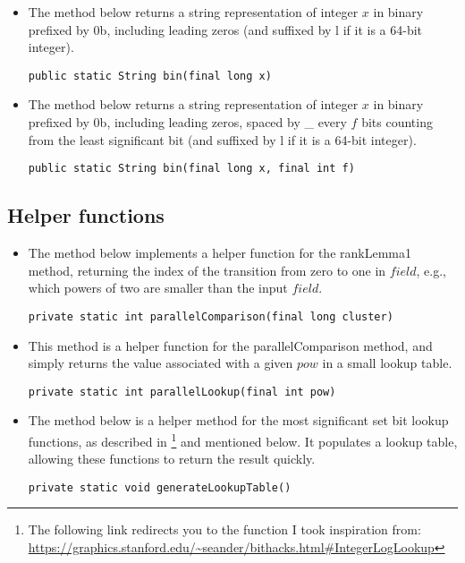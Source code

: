 \begin{itemize}
    \item
    The method below returns a string representation of integer $x$ in binary prefixed by {\ttfamily 0b}, including leading zeros (and suffixed by {\ttfamily l} if it is a 64-bit integer).
    \begin{lstlisting}
public static String bin(final long x)
    \end{lstlisting}
    
    \item
    The method below returns a string representation of integer $x$ in binary prefixed by {\ttfamily 0b}, including leading zeros, spaced by {\ttfamily \_} every $f$ bits counting from the least significant bit (and suffixed by {\ttfamily l} if it is a 64-bit integer).
    \begin{lstlisting}
public static String bin(final long x, final int f)
    \end{lstlisting}
\end{itemize}

\subsection{Helper functions}

\begin{itemize}
    \item
    The method below implements a helper function for the {\ttfamily rankLemma1} method, returning the index of the transition from zero to one in $field$, e.g., which powers of two are smaller than the input $field$.
    \begin{lstlisting}
private static int parallelComparison(final long cluster)
    \end{lstlisting}

    \item
    This method is a helper function for the {\ttfamily parallelComparison} method, and simply returns the value associated with a given $pow$ in a small lookup table.
    \begin{lstlisting}
private static int parallelLookup(final int pow)
    \end{lstlisting}
    
    \item
    The method below is a helper method for the most significant set bit lookup functions, as described in \cite{bittricks}\footnote{The following link redirects you to the function I took inspiration from: \url{https://graphics.stanford.edu/~seander/bithacks.html\#IntegerLogLookup}} and mentioned below. It populates a lookup table, allowing these functions to return the result quickly. 
    \begin{lstlisting}
private static void generateLookupTable()
    \end{lstlisting}
\end{itemize}

